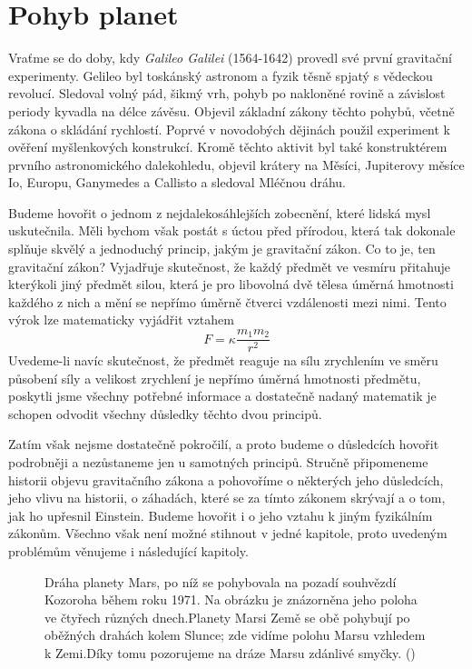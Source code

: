   \section{Pohyb planet}
    Vraťme se do doby, kdy \emph{Galileo Galilei} (1564-1642) provedl své první gravitační
    experimenty. Gelileo byl toskánský astronom a fyzik těsně spjatý s vědeckou revolucí. Sledoval
    volný pád, šikmý vrh, pohyb po nakloněné rovině a závislost periody kyvadla na délce závěsu.
    Objevil základní zákony těchto pohybů, včetně zákona o skládání rychlostí. Poprvé v novodobých
    dějinách použil experiment k ověření myšlenkových konstrukcí. Kromě těchto aktivit byl také
    konstruktérem prvního astronomického dalekohledu, objevil krátery na Měsíci, Jupiterovy měsíce
    Io, Europu, Ganymedes a Callisto a sledoval Mléčnou dráhu.

    Budeme hovořit o jednom z nejdalekosáhlejších zobecnění, které lidská mysl uskutečnila. Měli
    bychom však postát s úctou před přírodou, která tak dokonale splňuje skvělý a jednoduchý
    princip, jakým je gravitační zákon. Co to je, ten gravitační zákon? Vyjadřuje skutečnost, že
    každý předmět ve vesmíru přitahuje kterýkoli jiný předmět silou, která je pro libovolná dvě
    tělesa úměrná hmotnosti každého z nich a mění se nepřímo úměrně čtverci vzdálenosti mezi nimi.
    Tento výrok lze matematicky vyjádřit vztahem
    \begin{equation}\label{fyz:eq096}
      \boxed{F = \kappa\frac{m_1m_2}{r^2}}
    \end{equation}
    Uvedeme-li navíc skutečnost, že předmět reaguje na sílu zrychlením ve směru působení síly a 
    velikost zrychlení je nepřímo úměrná hmotnosti předmětu, poskytli jsme všechny potřebné 
    informace a dostatečně nadaný matematik je schopen odvodit všechny důsledky těchto dvou 
    principů.
    
    Zatím však nejsme dostatečně pokročilí, a proto budeme o důsledcích hovořit podrobněji a 
    nezůstaneme jen u samotných principů. Stručně připomeneme historii objevu gravitačního zákona a 
    pohovoříme o některých jeho důsledcích, jeho vlivu na historii, o záhadách, které se za tímto 
    zákonem skrývají a o tom, jak ho upřesnil Einstein. Budeme hovořit i o jeho vztahu k jiným 
    fyzikálním zákonům. Všechno však není možné stihnout v jedné kapitole, proto uvedeným problémům 
    věnujeme i následující kapitoly.

    \begin{figure}[ht!]  %
      \centering
      \caption{Dráha planety Mars, po níž se pohybovala na pozadí souhvězdí Kozoroha během roku 
               1971. Na obrázku je znázorněna jeho poloha ve čtyřech různých dnech.Planety Marsi 
               Země se obě pohybují po oběžných drahách kolem Slunce; zde vidíme polohu Marsu 
               vzhledem k Zemi.Díky tomu pozorujeme na dráze Marsu zdánlivé smyčky. 
               (\cite[s.~366]{Halliday2001})}
      \label{fyz:fig299}
    \end{figure}
    
